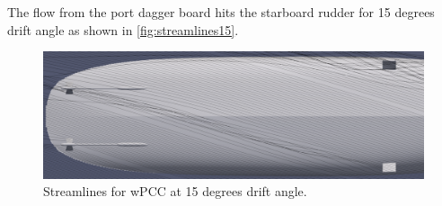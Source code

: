 The flow from the port dagger board hits the starboard rudder for 15 degrees drift angle as shown in \autoref{fig:streamlines15}.
\begin{figure}[h]
    \centering
    \includegraphics[width=\textwidth]{figures/paraview_drift_15.png}
    \caption{Streamlines for wPCC at 15 degrees drift angle.}
    \label{fig:streamlines15}
\end{figure}